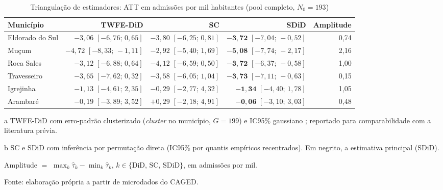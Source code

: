 \documentclass[a4paper,12pt]{article}
\begin{document}
\begin{table}[htbp]
\centering
\caption{Triangulação de estimadores: ATT em admissões por mil habitantes (pool completo, $N_0 = 193$)}
\label{tab:triangulacao}
\begin{threeparttable}
\small
\begin{tabular}{l r r r r}
\toprule
Município & TWFE-DiD\tnote{a} & SC\tnote{b} & SDiD\tnote{b} & Amplitude \\
\midrule
Eldorado do Sul & $-3{,}06$ $[-6{,}76;\,0{,}65]$ & $-3{,}80$ $[-6{,}25;\,0{,}81]$ & $\boldsymbol{-3{,}72}$ $[-7{,}04;\,-0{,}52]$ & 0,74 \\
Mu\c{c}um        & $-4{,}72$ $[-8{,}33;\,-1{,}11]$ & $-2{,}92$ $[-5{,}40;\,1{,}69]$ & $\boldsymbol{-5{,}08}$ $[-7{,}74;\,-2{,}17]$ & 2,16 \\
Roca Sales      & $-3{,}12$ $[-6{,}88;\,0{,}64]$ & $-4{,}12$ $[-6{,}59;\,0{,}50]$ & $\boldsymbol{-3{,}72}$ $[-6{,}37;\,-0{,}58]$ & 1,00 \\
Travesseiro     & $-3{,}65$ $[-7{,}62;\,0{,}32]$ & $-3{,}58$ $[-6{,}05;\,1{,}04]$ & $\boldsymbol{-3{,}73}$ $[-7{,}11;\,-0{,}63]$ & 0,15 \\
Igrejinha       & $-1{,}13$ $[-4{,}61;\,2{,}35]$ & $-0{,}29$ $[-2{,}77;\,4{,}32]$ & $\boldsymbol{-1{,}34}$ $[-4{,}40;\,1{,}78]$ & 1,05 \\
Arambaré        & $-0{,}19$ $[-3{,}89;\,3{,}52]$ & $+0{,}29$ $[-2{,}18;\,4{,}91]$ & $\boldsymbol{-0{,}06}$ $[-3{,}10;\,3{,}03]$ & 0,48 \\
\bottomrule
\end{tabular}
\begin{tablenotes}[flushleft]
\footnotesize
\item[a] TWFE-DiD com erro-padrão clusterizado (\textit{cluster} no município, $G = 199$) e IC95\% gaussiano \cite{bertrand2004}; reportado para comparabilidade com a literatura prévia.
\item[b] SC e SDiD com inferência por permutação direta (IC95\% por quantis empíricos recentrados). Em negrito, a estimativa principal (SDiD).
\item Amplitude $=$ $\max_k \hat{\tau}_k - \min_k \hat{\tau}_k$, $k \in \{\text{DiD, SC, SDiD}\}$, em admissões por mil.
\item Fonte: elaboração própria a partir de microdados do CAGED.
\end{tablenotes}
\end{threeparttable}
\end{table}
\end{document}
